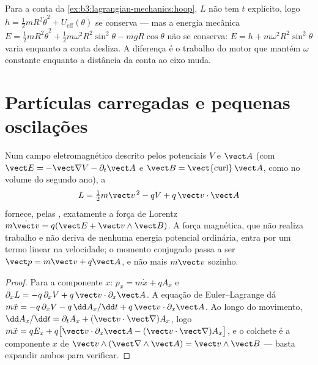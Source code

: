 \begin{example}\label{ex:b3:lagrangian-mechanics:hoop-energy}
Para a conta da \cref{ex:b3:lagrangian-mechanics:hoop}, $L$ não tem
$t$ explícito, logo $h = \tfrac12 mR^2\dot\theta^2 + U_{\text{eff}}
(\theta)$ se conserva --- mas a energia mecânica $E = \tfrac12
mR^2\dot\theta^2 + \tfrac12 m\omega^2R^2\sin^2\theta - mgR\cos\theta$
não se conserva: $E = h + m\omega^2R^2\sin^2\theta$ varia enquanto a
conta desliza. A diferença é o trabalho do motor que mantém $\omega$
constante enquanto a distância da conta ao eixo muda.
\end{example}

\section{Partículas carregadas e pequenas oscilações}

\begin{proposition}\label{prop:b3:lagrangian-mechanics:charge}
Num campo eletromagnético descrito pelos potenciais $V$ e
$\vect A$ (com $\vect E = -\vect\nabla V - \partial_t\vect A$ e
$\vect B = \operatorname{\vect{curl}}\vect A$, como no volume do
segundo ano), a 
\[
L = \tfrac12 m\vect v^{\,2} - qV + q\,\vect v\cdot\vect A
\]
fornece, pelas , exatamente a força de
Lorentz $m\dot{\vect v} = q(\vect E + \vect v\wedge\vect B)$. A força
magnética, que não realiza trabalho e não deriva de nenhuma energia
potencial ordinária, entra por um termo linear na velocidade; o momento
conjugado passa a ser $\vect p = m\vect v + q\vect A$, e não mais
$m\vect v$ sozinho.
\end{proposition}

\begin{proof}
Para a componente $x$: $p_x = m\dot x + qA_x$ e
$\partial_xL = -q\,\partial_xV + q\,\vect v\cdot\partial_x\vect A$. A
equação de Euler--Lagrange dá $m\ddot x = -q\,\partial_xV -
q\,\dd A_x/\dd t + q\,\vect v\cdot\partial_x\vect A$. Ao longo do
movimento, $\dd A_x/\dd t = \partial_tA_x + (\vect v\cdot\vect\nabla)A_x$, logo
$m\ddot x = qE_x + q\big[\vect v\cdot\partial_x\vect A - (\vect v\cdot
\vect\nabla)A_x\big]$, e o colchete é a componente $x$ de $\vect
v\wedge(\vect\nabla\wedge\vect A) = \vect v\wedge\vect B$ --- basta
expandir ambos para verificar.
\end{proof}

